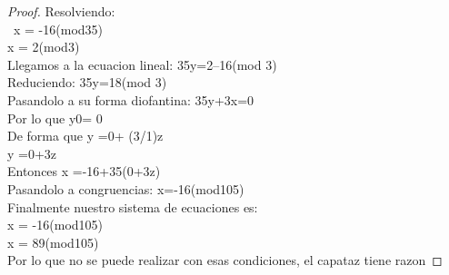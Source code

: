 \begin{proof}
Resolviendo:\\ \ 
x = -16(mod35)\\
x = 2(mod3)\\
Llegamos a la ecuacion lineal: 35y=2--16(mod 3)\\
Reduciendo: 35y=18(mod 3)\\
Pasandolo a su forma diofantina: 35y+3x=0\\
Por lo que y0= 0\\
De forma que y =0+ (3/1)z\\
y =0+3z\\
Entonces x =-16+35(0+3z)\\
Pasandolo a congruencias: x=-16(mod105)\\
Finalmente nuestro sistema de ecuaciones es:\\
x = -16(mod105)\\
x = 89(mod105)\\
Por lo que no se puede realizar con esas condiciones, el capataz tiene razon

\end{proof}
